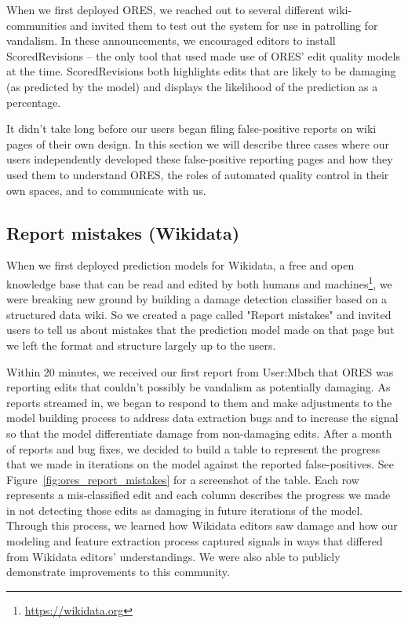 When we first deployed ORES, we reached out to several different wiki-communities and invited them to test out the system for use in patrolling for vandalism.  In these announcements, we encouraged editors to install ScoredRevisions -- the only tool that used made use of ORES' edit quality models at the time.  ScoredRevisions both highlights edits that are likely to be damaging (as predicted by the model) and displays the likelihood of the prediction as a percentage.

It didn't take long before our users began filing false-positive reports on wiki pages of their own design.  In this section we will describe three cases where our users independently developed these false-positive reporting pages and how they used them to understand ORES, the roles of automated quality control in their own spaces, and to communicate with us.

\subsection{Report mistakes (Wikidata)}

When we first deployed prediction models for Wikidata, a free and open knowledge base that can be read and edited by both humans and machines\footnote{\url{https://wikidata.org}}, we were breaking new ground by building a damage detection classifier based on a structured data wiki\cite{sarabadani2017building}.  So we created a page called "Report mistakes" and invited users to tell us about mistakes that the prediction model made on that page but we left the format and structure largely up to the users.

Within 20 minutes, we received our first report from User:Mbch that ORES was reporting edits that couldn't possibly be vandalism as potentially damaging.  As reports streamed in, we began to respond to them and make adjustments to the model building process to address data extraction bugs and to increase the signal so that the model differentiate damage from non-damaging edits.  After a month of reports and bug fixes, we decided to build a table to represent the progress that we made in iterations on the model against the reported false-positives.  See Figure~\ref{fig:ores_report_mistakes} for a screenshot of the table.  Each row represents a mis-classified edit and each column describes the progress we made in not detecting those edits as damaging in future iterations of the model.  Through this process, we learned how Wikidata editors saw damage and how our modeling and feature extraction process captured signals in ways that differed from Wikidata editors' understandings.  We were also able to publicly demonstrate improvements to this community.

